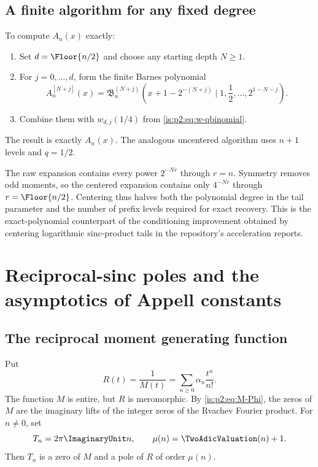 \subsection{A finite algorithm for any fixed degree}

\begin{algorithm}
\label{is:p2:alg:exact-Appell}
To compute $A_n(x)$ exactly:
\begin{enumerate}
\item Set $d=\Floor{n/2}$ and choose any starting depth $N\ge1$.
\item For $j=0,\ldots,d$, form the finite Barnes polynomial
\[
 A_n^{[N+j]}(x)
 =\mathfrak B_n^{(N+j)}
 \left(x+1-2^{-(N+j)}\mid1,\frac12,\ldots,2^{1-N-j}\right).
\]
\item Combine them with $w_{d,j}(1/4)$ from \eqref{is:p2:eq:w-qbinomial}.
\end{enumerate}
The result is exactly $A_n(x)$.  The analogous uncentered algorithm uses $n+1$ levels and
$q=1/2$.
\end{algorithm}

\begin{remark}
The raw expansion contains every power $2^{-Nr}$ through $r=n$.  Symmetry removes odd moments,
so the centered expansion contains only $4^{-Nr}$ through $r=\Floor{n/2}$.  Centering thus
halves both the polynomial degree in the tail parameter and the number of prefix levels required for
exact recovery.  This is the exact-polynomial counterpart of the conditioning improvement obtained
by centering logarithmic sinc-product tails in the repository's acceleration reports.
\end{remark}

\section{Reciprocal-sinc poles and the asymptotics of Appell constants}
\label{is:p2:sec:poles}

\subsection{The reciprocal moment generating function}

Put
\begin{equation}
 R(t)=\frac1{M(t)}
 =\sum_{n\ge0}\alpha_n\frac{t^n}{n!}.
 \label{is:p2:eq:R-def}
\end{equation}
The function $M$ is entire, but $R$ is meromorphic.  By \eqref{is:p2:eq:M-Phi}, the zeros of $M$ are the
imaginary lifts of the integer zeros of the Rvachev Fourier product.  For $n\ne0$, set
\begin{equation}
 T_n=2\pi\ImaginaryUnit n,
 \qquad
 \mu(n)=\TwoAdicValuation(n)+1.
 \label{is:p2:eq:T-mu}
\end{equation}
Then $T_n$ is a zero of $M$ and a pole of $R$ of order $\mu(n)$.

